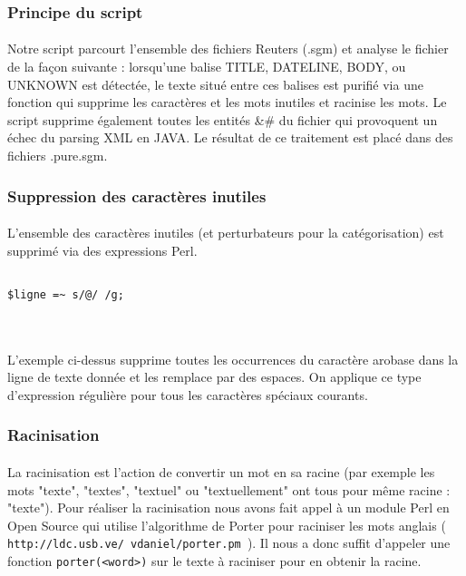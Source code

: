 \subsubsection{Principe du script}
\paragraph{}
Notre script parcourt l'ensemble des fichiers Reuters (.sgm) et analyse le fichier de la façon suivante : lorsqu'une balise TITLE, DATELINE, BODY, ou UNKNOWN est détectée, le texte situé entre ces balises est purifié via une fonction qui supprime les caractères et les mots inutiles et racinise les mots. Le script supprime également toutes les entités \&\# du fichier qui provoquent un échec du parsing XML en JAVA. Le résultat de ce traitement est placé dans des fichiers .pure.sgm.

\subsubsection{Suppression des caractères inutiles}
\paragraph{}
L'ensemble des caractères inutiles (et perturbateurs pour la catégorisation) est supprimé via des expressions  Perl.
~~\\
\begin{verbatim}

$ligne =~ s/@/ /g;
\end{verbatim}
~~\\
\paragraph{}
L'exemple ci-dessus supprime toutes les occurrences du caractère arobase dans la ligne de texte donnée et les remplace par des espaces. On applique ce type d'expression régulière pour tous les caractères spéciaux courants.

\subsubsection{Racinisation}
\paragraph{}
La racinisation est l'action de convertir un mot en sa racine (par exemple les mots "texte", "textes", "textuel" ou "textuellement" ont tous pour même racine : "texte"). Pour réaliser la racinisation nous avons fait appel à un module Perl en Open Source qui utilise l'algorithme de Porter pour raciniser les mots anglais (\texttt{ http://ldc.usb.ve/~vdaniel/porter.pm }). Il nous a donc suffit d'appeler une fonction \texttt{porter(<word>)} sur le texte à raciniser pour en obtenir la racine.

